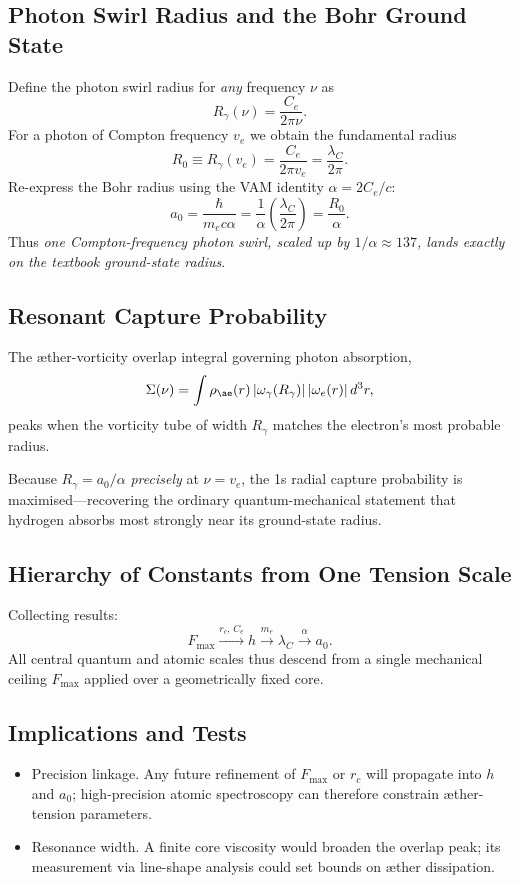 \documentclass[a4paper,12pt]{article}
\begin{document}
\subsection{Photon Swirl Radius and the Bohr Ground State}

Define the photon swirl radius for \textit{any} frequency $\nu$ as
\[
R_{\gamma}(\nu) = \frac{C_e}{2\pi\nu}.
\]
For a photon of Compton frequency $v_e$ we obtain the fundamental radius
\[
R_0 \equiv R_{\gamma}(v_e) = \frac{C_e}{2\pi v_e} = \frac{\lambda_C}{2\pi}.
\]
Re-express the Bohr radius using the VAM identity $\alpha = 2C_e/c$:
\[
a_0 = \frac{\hbar}{m_e c \alpha} = \frac{1}{\alpha} \left( \frac{\lambda_C}{2\pi} \right) = \frac{R_0}{\alpha}. \tag{X.2}
\]
Thus \textit{one Compton-frequency photon swirl, scaled up by $1/\alpha \approx 137$, lands exactly on the textbook ground-state radius}.

\subsection{Resonant Capture Probability}

The \ae ther-vorticity overlap integral governing photon absorption,
\[
\Sigma(\nu) = \int \rho_{\ae}(r)\,|\omega_{\gamma}(R_{\gamma})|\,|\omega_e(r)|\,d^3r,
\]
peaks when the vorticity tube of width $R_{\gamma}$ matches the electron's most probable radius.

Because $R_{\gamma} = a_0/\alpha$ \textit{precisely} at $\nu = v_e$, the 1s radial capture probability is maximised---recovering the ordinary quantum-mechanical statement that hydrogen absorbs most strongly near its ground-state radius.

\subsection{Hierarchy of Constants from One Tension Scale}

Collecting results:
\[
F_{\max} \xrightarrow{r_c,\,C_e} \boxed{h} \xrightarrow{m_e} \lambda_C \xrightarrow{\alpha} a_0.
\]
All central quantum and atomic scales thus descend from a single mechanical ceiling $F_{\max}$ applied over a geometrically fixed core.

\subsection{Implications and Tests}

\begin{itemize}
    \item Precision linkage. Any future refinement of $F_{\max}$ or $r_c$ will propagate into $h$ and $a_0$; high-precision atomic spectroscopy can therefore constrain \ae ther-tension parameters.
    \item Resonance width. A finite core viscosity would broaden the overlap peak; its measurement via line-shape analysis could set bounds on \ae ther dissipation.
\end{itemize}
\end{document}
